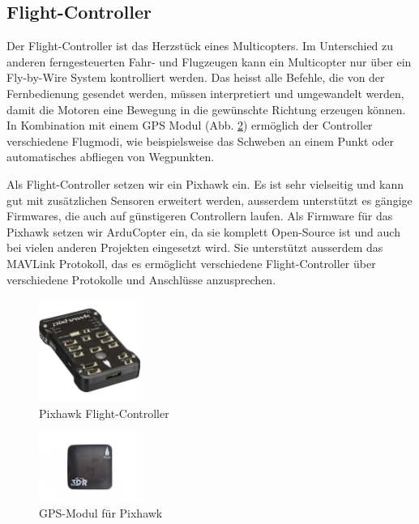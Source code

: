 \subsection{Flight-Controller}

Der Flight-Controller ist das Herzstück eines Multicopters. Im Unterschied zu anderen ferngesteuerten Fahr- und Flugzeugen kann ein Multicopter nur über ein Fly-by-Wire System kontrolliert werden. Das heisst alle Befehle, die von der Fernbedienung gesendet werden, müssen interpretiert und umgewandelt werden, damit die Motoren eine Bewegung in die gewünschte Richtung erzeugen können. In Kombination mit einem GPS Modul (Abb. \ref{fig:gps-module}) ermöglich der Controller verschiedene Flugmodi, wie beispielsweise das Schweben an einem Punkt oder automatisches abfliegen von Wegpunkten.

Als Flight-Controller setzen wir ein Pixhawk ein. Es ist sehr vielseitig und kann gut mit zusätzlichen Sensoren erweitert werden, ausserdem unterstützt es gängige Firmwares, die auch auf günstigeren Controllern laufen. Als Firmware für das Pixhawk setzen wir ArduCopter ein, da sie komplett Open-Source ist und auch bei vielen anderen Projekten eingesetzt wird. Sie unterstützt ausserdem das \Gls{MAVLink} Protokoll, das es ermöglicht verschiedene Flight-Controller über verschiedene Protokolle und Anschlüsse anzusprechen.

\begin{figure}[h]
\centering
\includegraphics[width=0.3\textwidth] {images/hardware/pixhawk.jpg} 
\caption{Pixhawk Flight-Controller}
\label{fig:pixhawk}
\end{figure}

\begin{figure}[h]
\centering
\includegraphics[width=0.3\textwidth] {images/hardware/gps-module.jpg} 
\caption{GPS-Modul für Pixhawk}
\label{fig:gps-module}
\end{figure}

